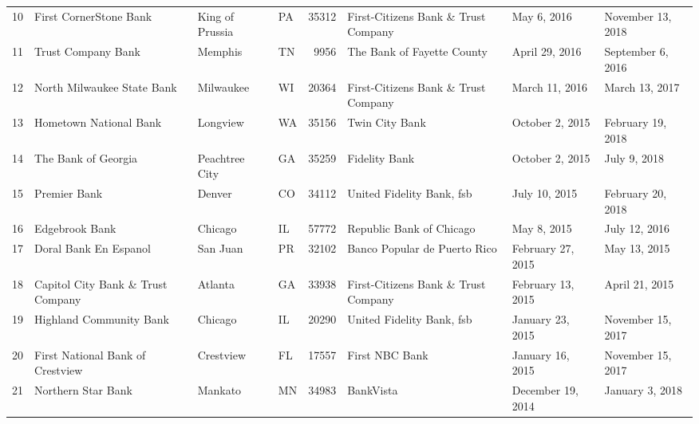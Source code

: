 \begin{tabular}{llllrlll}
10  &                             First CornerStone Bank &     King of Prussia &  PA &  35312 &                First-Citizens Bank \& Trust Company &         May 6, 2016 &   November 13, 2018 \\
11  &                                 Trust Company Bank &             Memphis &  TN &   9956 &                         The Bank of Fayette County &      April 29, 2016 &   September 6, 2016 \\
12  &                         North Milwaukee State Bank &           Milwaukee &  WI &  20364 &                First-Citizens Bank \& Trust Company &      March 11, 2016 &      March 13, 2017 \\
13  &                             Hometown National Bank &            Longview &  WA &  35156 &                                     Twin City Bank &     October 2, 2015 &   February 19, 2018 \\
14  &                                The Bank of Georgia &      Peachtree City &  GA &  35259 &                                      Fidelity Bank &     October 2, 2015 &        July 9, 2018 \\
15  &                                       Premier Bank &              Denver &  CO &  34112 &                          United Fidelity Bank, fsb &       July 10, 2015 &   February 20, 2018 \\
16  &                                     Edgebrook Bank &             Chicago &  IL &  57772 &                           Republic Bank of Chicago &         May 8, 2015 &       July 12, 2016 \\
17  &                             Doral Bank  En Espanol &            San Juan &  PR &  32102 &                       Banco Popular de Puerto Rico &   February 27, 2015 &        May 13, 2015 \\
18  &                  Capitol City Bank \& Trust Company &             Atlanta &  GA &  33938 &                First-Citizens Bank \& Trust Company &   February 13, 2015 &      April 21, 2015 \\
19  &                            Highland Community Bank &             Chicago &  IL &  20290 &                          United Fidelity Bank, fsb &    January 23, 2015 &   November 15, 2017 \\
20  &                   First National Bank of Crestview &           Crestview &  FL &  17557 &                                     First NBC Bank &    January 16, 2015 &   November 15, 2017 \\
21  &                                 Northern Star Bank &             Mankato &  MN &  34983 &                                          BankVista &   December 19, 2014 &     January 3, 2018 \\

\end{tabular}
